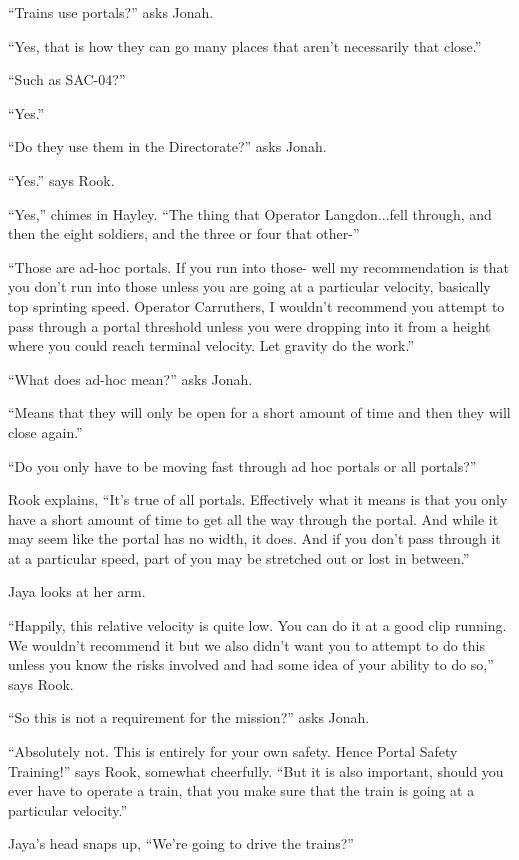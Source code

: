 ``Trains use portals?'' asks Jonah.

``Yes, that is how they can go many places that aren't necessarily that close.''

``Such as SAC-04?''

``Yes.''

``Do they use them in the Directorate?'' asks Jonah.

``Yes.'' says Rook.

``Yes,'' chimes in Hayley.  ``The thing that Operator Langdon...fell through, and then the eight soldiers, and the three or four that other-''

``Those are ad-hoc portals.  If you run into those- well my recommendation is that you don't run into those unless you are going at a particular velocity, basically top sprinting speed.  Operator Carruthers, I wouldn't recommend you attempt to pass through a portal threshold unless you were dropping into it from a height where you could reach terminal velocity.  Let gravity do the work.''  

``What does ad-hoc mean?'' asks Jonah.

``Means that they will only be open for a short amount of time and then they will close again.''  

``Do you only have to be moving fast through ad hoc portals or all portals?'' 

Rook explains, ``It's true of all portals.  Effectively what it means is that you only have a short amount of time to get all the way through the portal.  And while it may seem like the portal has no width, it does. And if you don't pass through it at a particular speed, part of you may be stretched out or lost in between.''

Jaya looks at her arm.

``Happily, this relative velocity is quite low.  You can do it at a good clip running.  We wouldn't recommend it but we also didn't want you to attempt to do this unless you know the risks involved and had some idea of your ability to do so,'' says Rook.

``So this is not a requirement for the mission?'' asks Jonah.

``Absolutely not.  This is entirely for your own safety.  Hence Portal Safety Training!'' says Rook, somewhat cheerfully.  ``But it is also important, should you ever have to operate a train, that you make sure that the train is going at a particular velocity.''

Jaya's head snaps up, ``We're going to drive the trains?''

